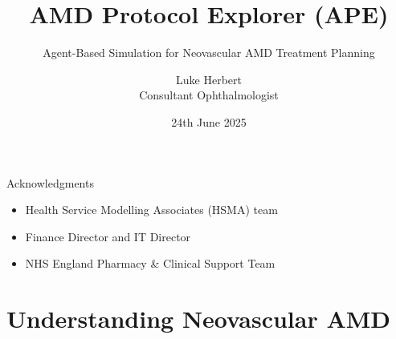 \documentclass[10pt,aspectratio=169]{beamer}
\title{AMD Protocol Explorer (APE)}
\subtitle{Agent-Based Simulation for Neovascular AMD Treatment Planning}
\author{Luke Herbert\\Consultant Ophthalmologist}
\institute{Surrey and Sussex Healthcare NHS Trust}
\date{24th June 2025}
\begin{document}
{
\maketitle
}

\begin{frame}{Acknowledgments}
\begin{itemize}
    \item Health Service Modelling Associates (HSMA) team
    \item Finance Director and IT Director
    \item NHS England Pharmacy \& Clinical Support Team
\end{itemize}
\end{frame}

\section{Understanding Neovascular AMD}
\end{document}
